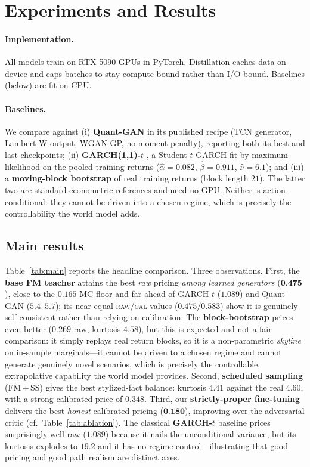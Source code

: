 \documentclass[11pt]{article}
\newcommand{\raw}{\textsc{raw}}
\renewcommand{\cal}{\textsc{cal}}
\newcommand{\best}[1]{\textbf{#1}}
\begin{document}
\section{Experiments and Results}
\label{sec:results}

\paragraph{Implementation.} All models train on RTX-5090 GPUs in PyTorch.
Distillation caches data on-device and caps batches to stay compute-bound rather
than I/O-bound. Baselines (below) are fit on CPU.

\paragraph{Baselines.} We compare against (i) \textbf{Quant-GAN}
\citep{wiese2020quant} in its published recipe (TCN generator, Lambert-W output,
WGAN-GP, no moment penalty), reporting both its best and last checkpoints;
(ii) \textbf{GARCH(1,1)-$t$} \citep{bollerslev1986garch,bollerslev1987conditionally},
a Student-$t$ GARCH fit by maximum likelihood on the pooled training returns
($\hat\alpha{=}0.082$, $\hat\beta{=}0.911$, $\hat\nu{=}6.1$); and
(iii) a \textbf{moving-block bootstrap} \citep{kunsch1989jackknife,
politis1994stationary} of real training returns (block length $21$). The latter
two are standard econometric references and need no GPU. Neither is
action-conditional: they cannot be driven into a chosen regime, which is precisely
the controllability the world model adds.

\subsection{Main results}
Table~\ref{tab:main} reports the headline comparison. Three observations.
First, the \textbf{base FM teacher} attains the best \emph{raw} pricing
\emph{among learned generators} ($\best{0.475}$), close to the $0.165$ MC floor and
far ahead of GARCH-$t$ ($1.089$) and Quant-GAN ($5.4$--$5.7$); its near-equal
\raw{}/\cal{} values ($0.475/0.583$) show it is genuinely self-consistent rather
than relying on calibration. The \textbf{block-bootstrap} prices even better
($0.269$ raw, kurtosis $4.58$), but this is expected and not a fair comparison: it
simply replays real return blocks, so it is a non-parametric \emph{skyline} on
in-sample marginals---it cannot be driven to a chosen regime and cannot generate
genuinely novel scenarios, which is precisely the controllable, extrapolative
capability the world model provides. Second, \textbf{scheduled sampling}
(FM\,+\,SS) gives the best stylized-fact balance: kurtosis $4.41$ against the real
$4.60$, with a strong calibrated price of $0.348$. Third, our
\textbf{strictly-proper fine-tuning} delivers the best \emph{honest} calibrated
pricing ($\best{0.180}$), improving over the adversarial critic (cf.\
Table~\ref{tab:ablation}). The classical \textbf{GARCH-$t$} baseline prices
surprisingly well raw ($1.089$) because it nails the unconditional variance, but
its kurtosis explodes to $19.2$ and it has no regime control---illustrating that
good pricing and good path realism are distinct axes.
\end{document}
